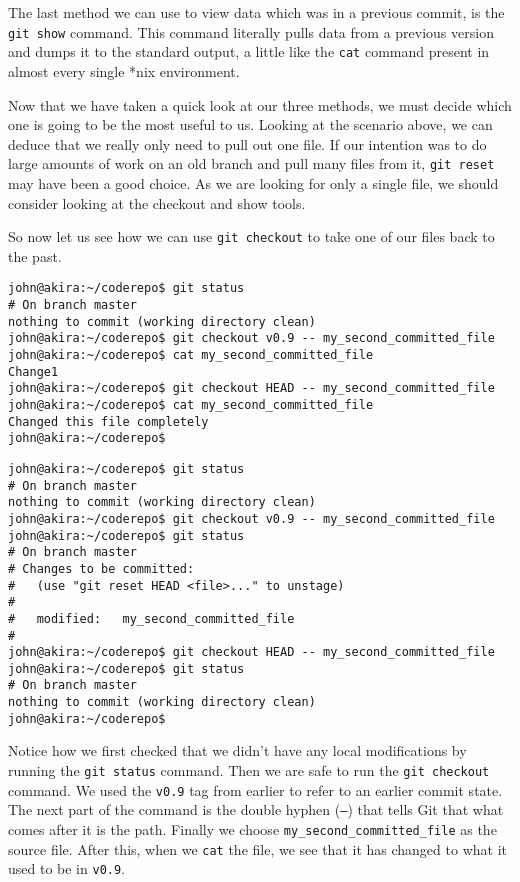 The last method we can use to view data which was in a previous commit, is the \texttt{git show} command.  This command literally pulls data from a previous version and dumps it to the standard output, a little like the \texttt{cat} command present in almost every single *nix environment.

Now that we have taken a quick look at our three methods, we must decide which one is going to be the most useful to us.  Looking at the scenario above, we can deduce that we really only need to pull out one file.  If our intention was to do large amounts of work on an old branch and pull many files from it, \texttt{git reset} may have been a good choice.  As we are looking for only a single file, we should consider looking at the checkout and show tools.

So now let us see how we can use \texttt{git checkout} to take one of our files back to the past.

\begin{Verbatim}[frame=leftline,framerule=1mm,fontsize=\relsize{-3}] 
john@akira:~/coderepo$ git status
# On branch master
nothing to commit (working directory clean)
john@akira:~/coderepo$ git checkout v0.9 -- my_second_committed_file
john@akira:~/coderepo$ cat my_second_committed_file 
Change1
john@akira:~/coderepo$ git checkout HEAD -- my_second_committed_file
john@akira:~/coderepo$ cat my_second_committed_file 
Changed this file completely
john@akira:~/coderepo$ 
\end{Verbatim}

\begin{Verbatim}[frame=leftline,framerule=1mm,fontsize=\relsize{-3}] 
john@akira:~/coderepo$ git status
# On branch master
nothing to commit (working directory clean)
john@akira:~/coderepo$ git checkout v0.9 -- my_second_committed_file
john@akira:~/coderepo$ git status
# On branch master
# Changes to be committed:
#   (use "git reset HEAD <file>..." to unstage)
#
#	modified:   my_second_committed_file
#
john@akira:~/coderepo$ git checkout HEAD -- my_second_committed_file
john@akira:~/coderepo$ git status
# On branch master
nothing to commit (working directory clean)
john@akira:~/coderepo$ 
\end{Verbatim}

Notice how we first checked that we didn't have any local modifications by running the \texttt{git status} command.  Then we are safe to run the \texttt{git checkout} command.  We used the \texttt{v0.9} tag from earlier to refer to an earlier commit state.  The next part of the command is the double hyphen (\texttt{--}) that tells Git that what comes after it is the path.  Finally we choose \texttt{my\_second\_committed\_file} as the source file.  After this, when we \texttt{cat} the file, we see that it has changed to what it used to be in \texttt{v0.9}.

